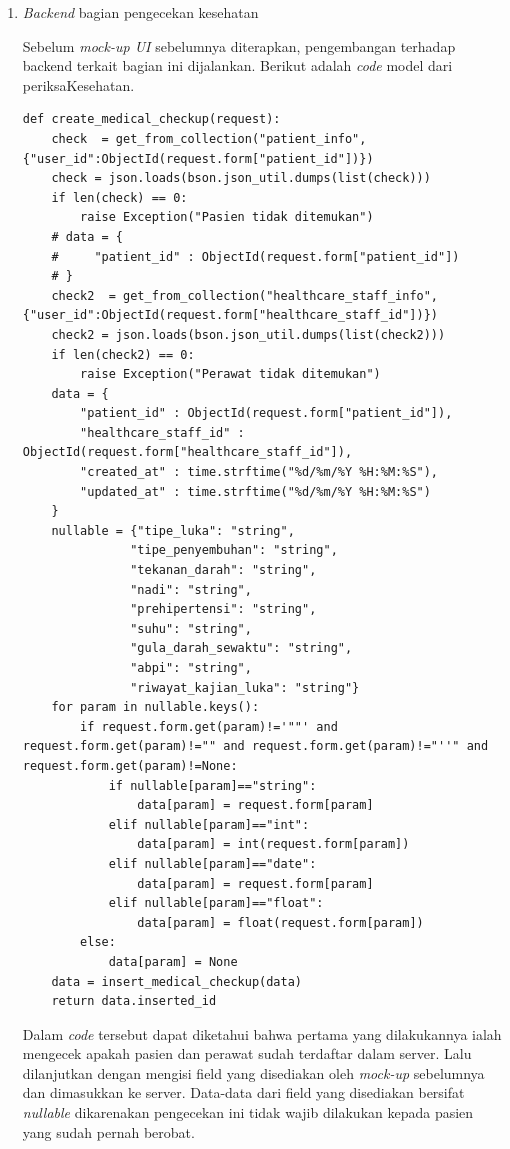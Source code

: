 \begin{enumerate}
	
	\item \textit{Backend} bagian pengecekan kesehatan
	
	Sebelum \textit{mock-up UI} sebelumnya diterapkan, pengembangan terhadap backend terkait bagian ini dijalankan. Berikut adalah \textit{code} model dari periksaKesehatan.
	\begin{lstlisting}
def create_medical_checkup(request):
    check  = get_from_collection("patient_info",{"user_id":ObjectId(request.form["patient_id"])})
    check = json.loads(bson.json_util.dumps(list(check)))
    if len(check) == 0:
        raise Exception("Pasien tidak ditemukan")
    # data = {
    #     "patient_id" : ObjectId(request.form["patient_id"])
    # }
    check2  = get_from_collection("healthcare_staff_info",{"user_id":ObjectId(request.form["healthcare_staff_id"])})
    check2 = json.loads(bson.json_util.dumps(list(check2)))
    if len(check2) == 0:
        raise Exception("Perawat tidak ditemukan")
    data = {
        "patient_id" : ObjectId(request.form["patient_id"]),
        "healthcare_staff_id" : ObjectId(request.form["healthcare_staff_id"]), 
        "created_at" : time.strftime("%d/%m/%Y %H:%M:%S"),
        "updated_at" : time.strftime("%d/%m/%Y %H:%M:%S")
    }
    nullable = {"tipe_luka": "string",
               "tipe_penyembuhan": "string",
               "tekanan_darah": "string",
               "nadi": "string",
               "prehipertensi": "string",
               "suhu": "string",
               "gula_darah_sewaktu": "string",
               "abpi": "string",
               "riwayat_kajian_luka": "string"}
    for param in nullable.keys():
        if request.form.get(param)!='""' and request.form.get(param)!="" and request.form.get(param)!="''" and request.form.get(param)!=None:
            if nullable[param]=="string":
                data[param] = request.form[param]
            elif nullable[param]=="int":
                data[param] = int(request.form[param])
            elif nullable[param]=="date":
                data[param] = request.form[param]
            elif nullable[param]=="float":
                data[param] = float(request.form[param])
        else:
            data[param] = None
    data = insert_medical_checkup(data)
    return data.inserted_id
	\end{lstlisting}
	Dalam \textit{code} tersebut dapat diketahui bahwa pertama yang dilakukannya ialah mengecek apakah pasien dan perawat sudah terdaftar dalam server. Lalu dilanjutkan dengan mengisi field yang disediakan oleh \textit{mock-up} sebelumnya dan dimasukkan ke server. Data-data dari field yang disediakan bersifat \textit{nullable} dikarenakan pengecekan ini tidak wajib dilakukan kepada pasien yang sudah pernah berobat.
	

\end{enumerate}
